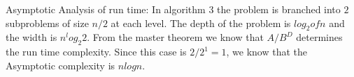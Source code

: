 Asymptotic Analysis of run time:
	In algorithm 3 the problem is branched into $2$ subproblems of size $n/2$ at each level.  The depth of the problem is $log_2 of n$ and the width is $n^log_2 2$.  From the master theorem we know that $A/B^D$ determines the run time complexity.  Since this case is $2/2^1 = 1$, we know that the Asymptotic complexity is $n log n$.
